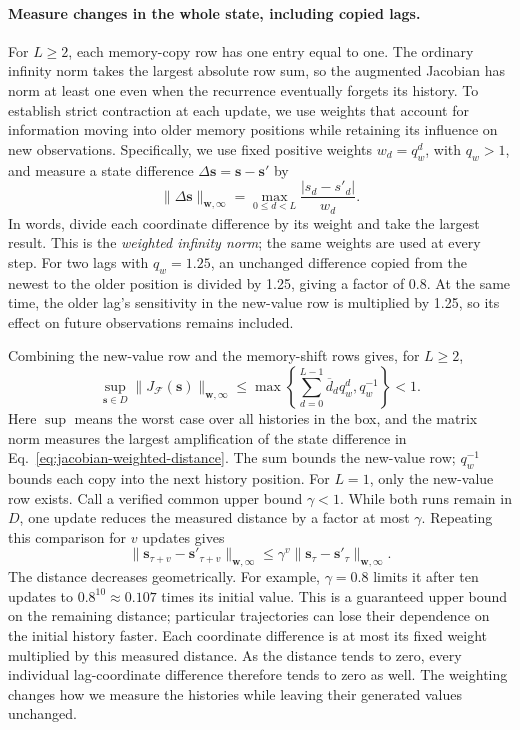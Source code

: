 \paragraph{Measure changes in the whole state, including copied lags.}
For $L\geq2$, each memory-copy row has one entry equal to one. The ordinary
infinity norm takes the largest absolute row sum, so the augmented Jacobian
has norm at least one even when the recurrence eventually forgets its
history. To establish strict contraction at each update, we use weights
that account for information moving into older memory positions while
retaining its influence on new observations. Specifically, we use fixed
positive weights $w_d=q_w^d$, with $q_w>1$, and measure a state
difference $\Delta\mathbf{s}=\mathbf{s}-\mathbf{s}'$ by
\begin{equation}
 \|\Delta\mathbf{s}\|_{\mathbf w,\infty}
 =\max_{0\leq d<L}\frac{|s_d-s'_d|}{w_d}.
 \label{eq:jacobian-weighted-distance}
\end{equation}
In words, divide each coordinate difference by its weight and take the largest
result. This is the \emph{weighted infinity norm}; the same weights are used
at every step. For two lags with $q_w=1.25$, an unchanged difference copied
from the newest to the older position is divided by 1.25, giving a factor
of 0.8. At the same time, the older lag's sensitivity in the new-value row is
multiplied by 1.25, so its effect on future observations remains included.

Combining the new-value row and the memory-shift rows gives, for $L\geq2$,
\begin{equation}
 \sup_{\mathbf{s}\in D}\|J_{\mathcal F}(\mathbf{s})\|_{\mathbf w,\infty}
 \leq\max\left\{\sum_{d=0}^{L-1}\overline d_d q_w^d,
                       q_w^{-1}\right\}<1.
 \label{eq:implemented-weighted-contraction}
\end{equation}
Here $\sup$ means the worst case over all histories in the box, and the matrix
norm measures the largest amplification of the state difference in
Eq.~\eqref{eq:jacobian-weighted-distance}. The sum bounds the new-value row;
$q_w^{-1}$ bounds each copy into the next history position. For $L=1$,
only the new-value row exists. Call a verified common upper bound $\gamma<1$.
While both runs remain in $D$, one update reduces the measured distance by
a factor at most $\gamma$. Repeating this comparison for $v$ updates gives
\begin{equation}
 \|\mathbf{s}_{\tau+v}-\mathbf{s}'_{\tau+v}\|_{\mathbf w,\infty}
 \leq\gamma^v
       \|\mathbf{s}_{\tau}-\mathbf{s}'_{\tau}\|_{\mathbf w,\infty}.
 \label{eq:jacobian-history-forgetting}
\end{equation}
The distance decreases geometrically. For example, $\gamma=0.8$ limits it
after ten updates to $0.8^{10}\approx0.107$ times its initial value.
This is a guaranteed upper bound on the remaining distance; particular
trajectories can lose their dependence on the initial history faster.
Each coordinate difference is at most its fixed weight multiplied by this
measured distance. As the distance tends to zero, every individual
lag-coordinate difference therefore tends to zero as well. The weighting
changes how we measure the histories while leaving their generated values
unchanged.

